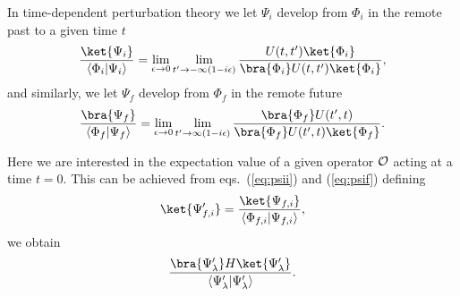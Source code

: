 In time-dependent
perturbation theory we let $\Psi_i$ develop from $\Phi_i$ in the
remote past to a given time $t$
\begin{equation}
	      \frac{\ket{\Psi_i}}
	      {\left\langle\Phi_i | \Psi_i \right\rangle}=
	      \lim_{\epsilon \rightarrow 0}
	      \lim_{t'\rightarrow -\infty (1-i\epsilon )}
	      \frac{U(t,t' )\ket{\Phi_i} }
	      {\bra{\Phi_i} U(t,t' )\ket{\Phi_i} },
	      \label{eq:psii}
\end{equation}
and similarly, we let
$\Psi_f$ develop from $\Phi_f$ in the remote future
\begin{equation}
	       \frac{\bra{\Psi_f}}{\left\langle
	       \Phi_f | \Psi_f \right\rangle}=
	       \lim_{\epsilon \rightarrow 0}
	       \lim_{t'\rightarrow \infty (1-i\epsilon )}
	       \frac{\bra{\Phi_f}U(t' ,t) }
	      {\bra{\Phi_f} U(t' ,t)\ket{\Phi_f} }.
	      \label{eq:psif}
\end{equation}

Here we are interested in the expectation value of a given
operator ${\cal O}$ acting at a time $t=0$. This can be achieved
from eqs.\ (\ref{eq:psii}) and (\ref{eq:psif}) defining
\begin{equation}
       \ket{\Psi_{f,i}'}=
       \frac{\ket{\Psi_{f,i}}}{\left\langle
       \Phi_{f,i} | \Psi_{f,i} \right\rangle},
\end{equation}
we obtain
\begin{equation}
	       {\displaystyle  \frac{
	       \bra{\Psi_{\lambda}'}H\ket{\Psi_{\lambda}'} }
	       {\left\langle\Psi_{\lambda}' |
	       \Psi_{\lambda}' \right\rangle} }
	       \label{eq:hexpect}.
\end{equation}

